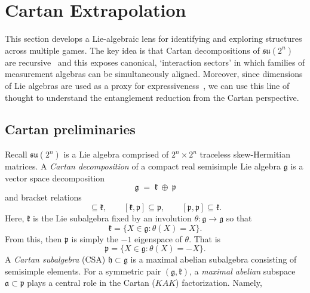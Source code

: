 \documentclass{article}
\begin{document}
\section{Cartan Extrapolation}\label{sec: Cartan}
    This section develops a Lie-algebraic lens for identifying and exploring structures across multiple games. The key idea is that Cartan decompositions of $\mathfrak{su}(2^n)$ are recursive~\cite{khaneja2001cartan} and this exposes canonical, `interaction sectors' in which families of measurement algebras can be simultaneously aligned. Moreover, since dimensions of Lie algebras are used as a proxy for expressiveness~\cite{larocca2022group}, we can use this line of thought to understand the entanglement reduction from the Cartan perspective.

\subsection{Cartan preliminaries}
    Recall $\mathfrak{su}(2^n)$ is a Lie algebra comprised of $2^n\times 2^n$ traceless skew-Hermitian matrices. 
    A \emph{Cartan decomposition} of a compact real semisimple Lie algebra $\mathfrak{g}$ is a vector space decomposition
    \begin{equation}\label{eq:Cartan-decomp}
        \mathfrak{g}\;=\;\mathfrak{k}\  \oplus\ \mathfrak{p}
    \end{equation}
   and bracket relations
    \begin{equation*}
        [\mathfrak{k},\mathfrak{k}]\subseteq \mathfrak{k},\qquad
        [\mathfrak{k},\mathfrak{p}]\subseteq \mathfrak{p},\qquad
        [\mathfrak{p},\mathfrak{p}]\subseteq \mathfrak{k}.
    \end{equation*}
    Here, $\mathfrak{k}$ is the Lie subalgebra fixed by an involution $\theta:\mathfrak{g}\to\mathfrak{g}$ so that 
    \begin{equation*}
        \mathfrak{k}= \{X\in \mathfrak{g}: \theta(X)=X \}.
    \end{equation*}
    From this, then $\mathfrak{p}$ is simply the $-1$ eigenspace of $\theta$. That is 
    \begin{equation}
        \mathfrak{p}= \{X\in \mathfrak{g}: \theta(X)= -X \}.
    \end{equation}
    A \emph{Cartan subalgebra} (CSA) $\mathfrak{h}\subset\mathfrak{g}$ is a maximal abelian subalgebra consisting of semisimple elements. For a symmetric pair $(\mathfrak{g},\mathfrak{k})$, a \emph{maximal abelian} subspace $\mathfrak{a}\subset\mathfrak{p}$ plays a central role in the Cartan ($KAK$) factorization. Namely, 
\end{document}
